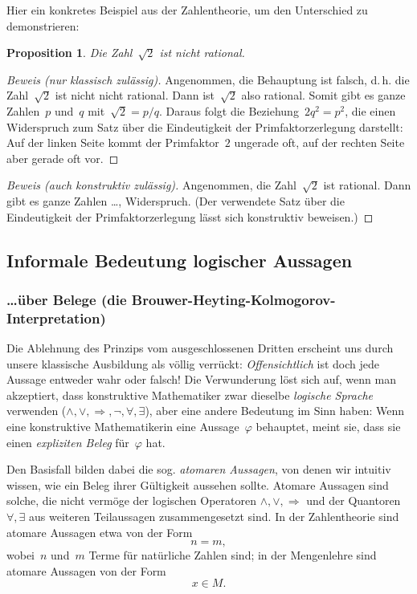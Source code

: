\documentclass[a4paper,ngerman,12pt]{scrartcl}
\theoremstyle{definition}
\theoremstyle{plain}
\newtheorem{prop}[defn]{Proposition}
\theoremstyle{remark}
\renewcommand{\_}{\mathpunct{.}\,}
\newcommand{\?}{\,{:}\,}
\begin{document}
Hier ein konkretes Beispiel aus der Zahlentheorie, um den Unterschied zu
demonstrieren:
\begin{prop}Die Zahl~$\sqrt{2}$ ist nicht rational.\end{prop}
\begin{proof}[Beweis (nur klassisch zulässig)]
Angenommen, die Behauptung ist falsch, d.\,h. die Zahl~$\sqrt{2}$ ist nicht
nicht rational. Dann ist~$\sqrt{2}$ also rational. Somit gibt es ganze
Zahlen~$p$ und~$q$ mit~$\sqrt{2} = p / q$. Daraus folgt die Beziehung~$2q^2 =
p^2$, die einen Widerspruch zum Satz über die Eindeutigkeit der
Primfaktorzerlegung darstellt: Auf der linken Seite kommt der Primfaktor~$2$
ungerade oft, auf der rechten Seite aber gerade oft vor.
\end{proof}
\begin{proof}[Beweis (auch konstruktiv zulässig)]
Angenommen, die Zahl~$\sqrt{2}$ ist rational. Dann gibt es ganze Zahlen \ldots,
Widerspruch. (Der verwendete Satz über die Eindeutigkeit der
Primfaktorzerlegung lässt sich konstruktiv beweisen.)
\end{proof}


\subsection{Informale Bedeutung logischer Aussagen}

\subsubsection*{\ldots über Belege (die
Brouwer-Heyting-Kolmogorov-Interpretation)}

Die Ablehnung des Prinzips vom ausgeschlossenen Dritten erscheint uns durch
unsere klassische Ausbildung als völlig verrückt: \emph{Offensichtlich} ist
doch jede Aussage entweder wahr oder falsch! Die Verwunderung löst sich auf,
wenn man akzeptiert, dass konstruktive Mathematiker zwar dieselbe
\emph{logische Sprache} verwenden ($\wedge, \vee, \Rightarrow, \neg, \forall,
\exists$), aber eine andere Bedeutung im Sinn haben: Wenn eine konstruktive
Mathematikerin eine Aussage~$\varphi$ behauptet, meint sie, dass sie einen
\emph{expliziten Beleg} für~$\varphi$ hat.

Den Basisfall bilden dabei die sog. \emph{atomaren Aussagen}, von denen wir
intuitiv wissen, wie ein Beleg ihrer Gültigkeit aussehen sollte. Atomare Aussagen sind
solche, die nicht vermöge der logischen Operatoren $\wedge, \vee,
\Rightarrow$ und der Quantoren~$\forall, \exists$ aus weiteren Teilaussagen
zusammengesetzt sind. In der Zahlentheorie sind atomare Aussagen etwa von der
Form
\[ n = m, \]
wobei~$n$ und~$m$ Terme für natürliche Zahlen sind; in der Mengenlehre sind
atomare Aussagen von der Form
\[ x \in M. \]
\end{document}
